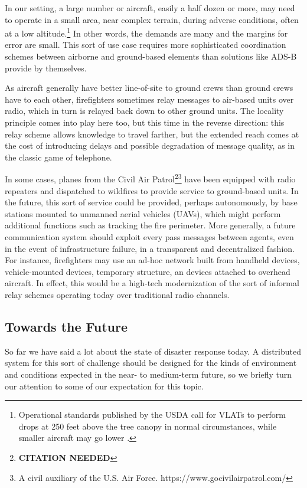 \documentclass[]             %
{NASA}                       %
\theoremstyle{definition}
\newcommand{\citationneeded}{\footnote{\textbf{CITATION NEEDED}}}
\begin{document}
In our setting, a large number or aircraft, easily a half dozen or
more, may need to operate in a small area, near complex terrain,
during adverse conditions, often at a low
altitude.\footnote{Operational standards published by the USDA call
for VLATs to perform drops at 250 feet above the tree canopy in normal
circumstances, while smaller aircraft may go lower
\cite{2019:airtankerops}.} In other words, the demands are many and the
margins for error are small. This sort of use case requires more
sophisticated coordination schemes between airborne and ground-based
elements than solutions like ADS-B provide by themselves.

As aircraft generally have better line-of-site to ground crews than
ground crews have to each other, firefighters sometimes relay messages
to air-based units over radio, which in turn is relayed back down to
other ground units. The locality principle comes into play here too, but
this time in the reverse direction: this relay scheme allows knowledge
to travel farther, but the extended reach comes at the cost of
introducing delays and possible degradation of message quality, as in
the classic game of telephone.

In some cases, planes from the Civil Air
Patrol\citationneeded\footnote{A civil auxiliary of the U.S. Air
Force. https://www.gocivilairpatrol.com/} have been equipped with
radio repeaters and dispatched to wildfires to provide service to
ground-based units. In the future, this sort of service could be
provided, perhaps autonomously, by base stations mounted to unmanned
aerial vehicles (UAVs), which might perform additional functions such
as tracking the fire perimeter. More generally, a future communication
system should exploit every pass messages between agents, even in the
event of infrastructure failure, in a transparent and decentralized
fashion. For instance, firefighters may use an ad-hoc network built
from handheld devices, vehicle-mounted devices, temporary structure,
an devices attached to overhead aircraft.  In effect, this would be a
high-tech modernization of the sort of informal relay schemes
operating today over traditional radio channels.

\subsection{Towards the Future}\label{towards-the-future}

So far we have said a lot about the state of disaster response
today. A distributed system for this sort of challenge should be
designed for the kinds of environment and conditions expected in the
near- to medium-term future, so we briefly turn our attention to some
of our expectation for this topic.
\end{document}
